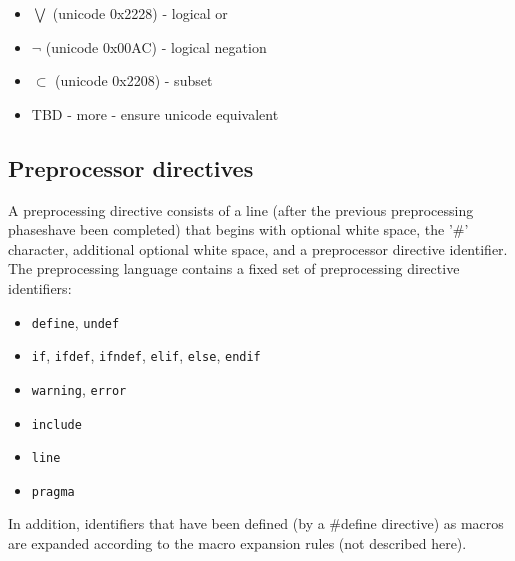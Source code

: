 \begin{itemize}
\begin{itemize}
		\item[] $\bigvee$ (unicode 0x2228) - logical or
		\item[] $\neg$ (unicode 0x00AC) - logical negation
		\item[] $\subset$ (unicode 0x2208) - subset
		\item TBD - more - ensure unicode equivalent
	\end{itemize}
\end{itemize}

\subsection{Preprocessor directives}
A preprocessing directive consists of a line (after the previous preprocessing phaseshave been completed) that begins with optional white space, the '\#' character, additional optional white space, and a preprocessor directive identifier.
The preprocessing language contains a fixed set of preprocessing directive identifiers:
\begin{itemize}
	\item \texttt{define}, \texttt{undef}
	\item \texttt{if}, \texttt{ifdef}, \texttt{ifndef}, \texttt{elif}, \texttt{else}, \texttt{endif}
	\item \texttt{warning}, \texttt{error}
	\item \texttt{include}
	\item \texttt{line}
	\item \texttt{pragma}
\end{itemize}
In addition, identifiers that have been defined (by a \#define directive) as macros are expanded according to the macro expansion rules (not described here).

